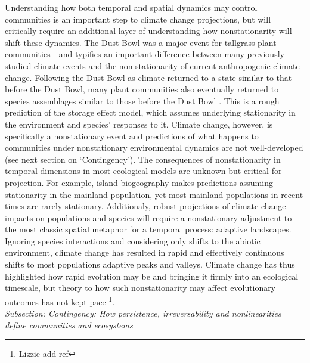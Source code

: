\documentclass[11pt,a4paper,oneside]{article}
\begin{document}
Understanding how both temporal and spatial dynamics may control communities is an important step to climate change projections, but will critically require an additional layer of understanding how nonstationarity will shift these dynamics. The Dust Bowl was a major event for tallgrass plant communities---and typifies an important difference between many previously-studied climate events and the non-stationarity of current anthropogenic climate change. Following the Dust Bowl as climate returned to a state similar to that before the Dust Bowl, many plant communities also eventually returned to species assemblages similar to those before the Dust Bowl \citep{Weaver1936}. This is a rough prediction of the storage effect model, which assumes underlying stationarity in the environment and species' responses to it. Climate change, however, is specifically a nonstationary event and predictions of what happens to communities under nonstationary environmental dynamics are not well-developed (see next section on `Contingency'). The consequences of nonstationarity in temporal dimensions in most ecological models are unknown but critical for projection. For example, island biogeography makes predictions assuming stationarity in the mainland population, yet most mainland populations in recent times are rarely stationary. Additionaly, robust projections of climate change impacts on populations and species will require a nonstationary adjustment to the most classic spatial metaphor for a temporal process: adaptive landscapes. Ignoring species interactions and considering only shifts to the abiotic environment, climate change has resulted in rapid and effectively continuous shifts to most populations adaptive peaks and valleys. Climate change has thus highlighted how rapid evolution may be and bringing it firmly into an ecological timescale, but theory to how such nonstationarity may affect evolutionary outcomes has not kept pace \footnote{Lizzie add ref}.\\

\noindent \emph{Subsection: Contingency: How persistence, irreversability and nonlinearities define communities and ecosystems}\\
\end{document}
